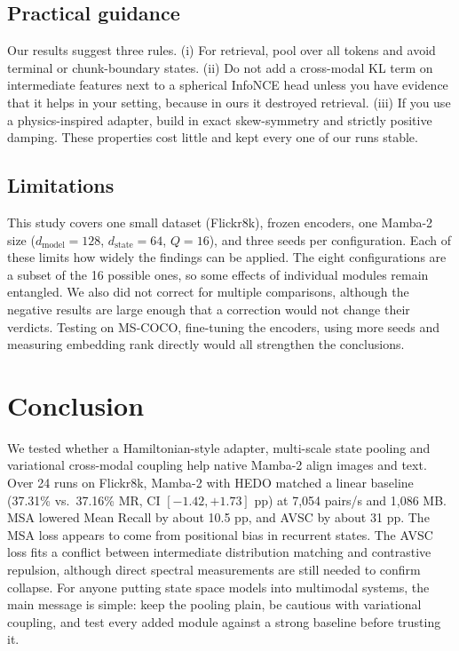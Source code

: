 \documentclass[pdflatex,sn-mathphys-num]{sn-jnl}
\begin{document}
\subsection{Practical guidance}
Our results suggest three rules. (i) For retrieval, pool over all tokens and avoid terminal or chunk-boundary states. (ii) Do not add a cross-modal KL term on intermediate features next to a spherical InfoNCE head unless you have evidence that it helps in your setting, because in ours it destroyed retrieval. (iii) If you use a physics-inspired adapter, build in exact skew-symmetry and strictly positive damping. These properties cost little and kept every one of our runs stable.

\subsection{Limitations}
This study covers one small dataset (Flickr8k), frozen encoders, one Mamba-2 size ($d_{\mathrm{model}}=128$, $d_{\mathrm{state}}=64$, $Q=16$), and three seeds per configuration. Each of these limits how widely the findings can be applied. The eight configurations are a subset of the 16 possible ones, so some effects of individual modules remain entangled. We also did not correct for multiple comparisons, although the negative results are large enough that a correction would not change their verdicts. Testing on MS-COCO, fine-tuning the encoders, using more seeds and measuring embedding rank directly would all strengthen the conclusions.

\section{Conclusion}
\label{sec:conclusion}

We tested whether a Hamiltonian-style adapter, multi-scale state pooling and variational cross-modal coupling help native Mamba-2 align images and text. Over 24 runs on Flickr8k, Mamba-2 with HEDO matched a linear baseline (37.31\% vs.\ 37.16\% MR, CI $[-1.42,+1.73]$ pp) at 7,054 pairs/s and 1,086 MB. MSA lowered Mean Recall by about 10.5 pp, and AVSC by about 31 pp. The MSA loss appears to come from positional bias in recurrent states. The AVSC loss fits a conflict between intermediate distribution matching and contrastive repulsion, although direct spectral measurements are still needed to confirm collapse. For anyone putting state space models into multimodal systems, the main message is simple: keep the pooling plain, be cautious with variational coupling, and test every added module against a strong baseline before trusting it.
\end{document}
